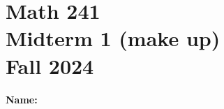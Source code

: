\documentclass[11pt, addpoints]{exam}
\begin{document}
\section*{Math 241\\
Midterm 1 (make up)\\ 
Fall 2024}

\vspace{0.5in}
\noindent\textbf{Name:} \underline{\hspace{3in}} \\ \\

\begin{center}
\begin{minipage}{0.3\linewidth}
\gradetable[v][questions]  
\end{minipage}   
\end{center}
\end{document}
